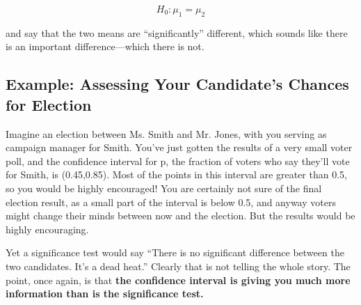 \begin{equation}
H_0:  \mu_1 = \mu_2
\end{equation}

and say that the two means are ``significantly'' different, which sounds
like there is an important difference---which there is not.

\subsection{Example:  Assessing Your Candidate's Chances for Election}

Imagine an election between Ms. Smith and Mr. Jones, with you serving as
campaign manager for Smith.  You've just gotten the results of a very
small voter poll, and the confidence interval for p, the fraction of
voters who say they'll vote for Smith, is (0.45,0.85).  Most of the
points in this interval are greater than 0.5, so you would be highly
encouraged!  You are certainly not sure of the final election result, as
a small part of the interval is below 0.5, and anyway voters might
change their minds between now and the election.  But the results would
be highly encouraging.

Yet a significance test would say ``There is no significant difference
between the two candidates.  It's a dead heat.''  Clearly that is not
telling the whole story.  The point, once again, is that {\bf the
confidence interval is giving you much more information than is the
significance test.}


